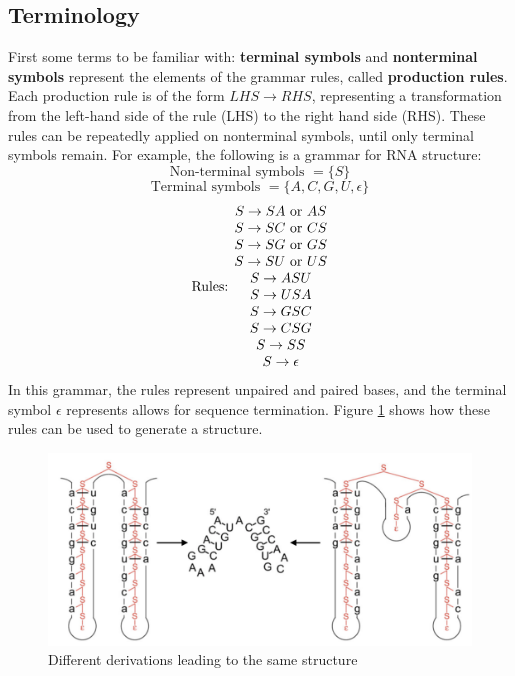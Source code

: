 \documentclass[12pt]{article}
\begin{document}
\subsection{Terminology}
First some terms to be familiar with: \textbf{terminal symbols} and \textbf{nonterminal symbols} represent the elements of the grammar rules, called \textbf{production rules}. Each production rule is of the form $LHS \longrightarrow RHS$, representing a transformation from the left-hand side of the rule (LHS) to the right hand side (RHS). These rules can be repeatedly applied on nonterminal symbols, until only terminal symbols remain. For example, the following is a grammar for RNA structure:
$$\text{Non-terminal symbols } = \{S\}$$
$$\text{Terminal symbols } = \{A, C, G, U, \epsilon\}$$
$$\text{Rules: } \begin{array}{@{}c@{}}
    S \rightarrow SA \text{ or } AS\\
    S \rightarrow SC \text{ or } CS \\
    S \rightarrow SG \text{ or } GS \\
    S \rightarrow SU \text{ or } US \\
    S \rightarrow ASU \\
    S \rightarrow USA \\
    S \rightarrow GSC \\
    S \rightarrow CSG \\
    S \rightarrow SS \\
    S \rightarrow \epsilon
    \end{array}$$
In this grammar, the rules represent unpaired and paired bases, and the terminal symbol $\epsilon$ represents allows for sequence termination. Figure \ref{fig:rna} shows how these rules can be used to generate a structure.
\begin{figure}[ht]
    \centering
    \includegraphics[width=.9\linewidth]{rna.png}
    \caption{Different derivations leading to the same structure}
    \label{fig:rna}
\end{figure}
\end{document}
